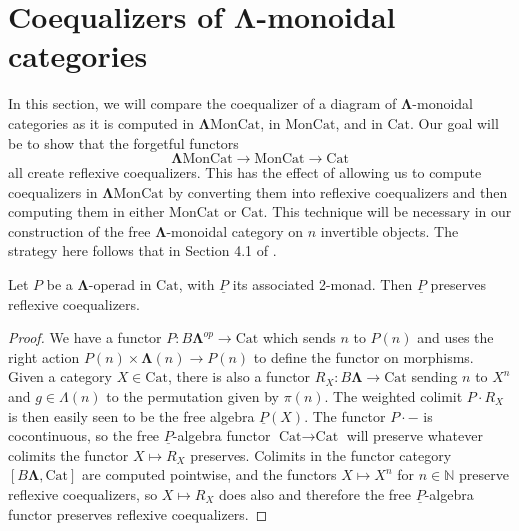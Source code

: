 \documentclass{amsbook} %
\newcommand{\und}[1]{\ensuremath{\underline{#1}}}
\newcommand{\ML}{\mathbf{\Lambda}}
\newcommand{\moncat}{\ensuremath{\textrm{MonCat}}}
\newcommand{\cat}{\ensuremath{\textrm{Cat}}}
\numberwithin{section}{chapter}
\begin{document}
\section{Coequalizers of \texorpdfstring{$\ML$}{\Lambda}-monoidal categories}
In this section, we will compare the coequalizer of a diagram of $\ML$-monoidal categories as it is computed in $\ML\moncat$, in $\moncat$, and in $\cat$. Our goal will be to show that the forgetful functors 
\[
\ML\moncat \to \moncat \to \cat
\]
all create reflexive coequalizers. This has the effect of allowing us to compute coequalizers in $\ML\moncat$ by converting them into reflexive coequalizers and then computing them in either $\moncat$ or $\cat$. This technique will be necessary in our construction of the free $\ML$-monoidal category on $n$ invertible objects. The strategy here follows that in Section 4.1 of \cite{lack-cod}.

\begin{lem}\label{P_pres_refl}
Let $P$ be a $\ML$-operad in $\cat$, with $\und{P}$ its associated 2-monad. Then $\und{P}$ preserves reflexive coequalizers.

\end{lem}
\begin{proof}
We have a functor $P:B\ML^{op} \to \cat$ which sends $n$ to $P(n)$ and uses the right action $P(n) \times \ML(n) \to P(n)$ to define the functor on morphisms. Given a category $X \in \cat$, there is also a functor $R_X:B\ML \to \cat$ sending $n$ to $X^n$ and $g \in \Lambda(n)$ to the permutation given by $\pi(n)$. The weighted colimit $P \cdot R_X$ is then easily seen to be the free algebra $\und{P}(X)$. The functor $P \cdot -$ is cocontinuous, so the free $\und{P}$-algebra functor $\cat \to \cat$ will preserve whatever colimits the functor $X \mapsto R_X$ preserves. Colimits in the functor category $[B\ML, \cat]$ are computed pointwise, and the functors $X \mapsto X^n$ for $n \in \mathbb{N}$ preserve reflexive coequalizers, so $X \mapsto R_X$ does also and therefore the free $\und{P}$-algebra functor preserves reflexive coequalizers.
\end{proof}
\end{document}
